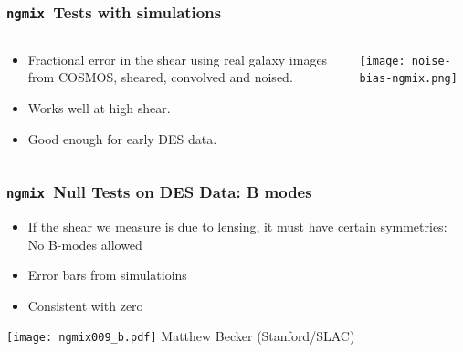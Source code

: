 \documentclass{beamer}
\newcommand{\ngmix}{\texttt{ngmix}}
\begin{document}
\frame
{
    \frametitle{\ngmix\ Tests with simulations}

    \fontsize{9}{0.8\baselineskip}
    \begin{columns}
        \begin{column}{0.3\textwidth}
            \begin{itemize}


                \item Fractional error in the shear using real galaxy
                    images from COSMOS, sheared, convolved and noised.

                \item Works well at high shear.

                \item Good enough for early DES data.

            \end{itemize}
        \end{column}
        \begin{column}{0.7\textwidth}
            \begin{center}
                \texttt{[image: noise-bias-ngmix.png]}
            \end{center}
        \end{column}
    \end{columns}

}


\frame
{
    \frametitle{\ngmix\ Null Tests on DES Data: B modes}

    \begin{itemize}

        \item If the shear we measure is due to lensing, it must have
            certain symmetries: No B-modes allowed

        \item Error bars from simulatioins
        
        \item Consistent with zero

    \end{itemize}

    \begin{center}
        \texttt{[image: ngmix009\_b.pdf]}
        \newline
        Matthew Becker (Stanford/SLAC)
    \end{center}

}
\end{document}
